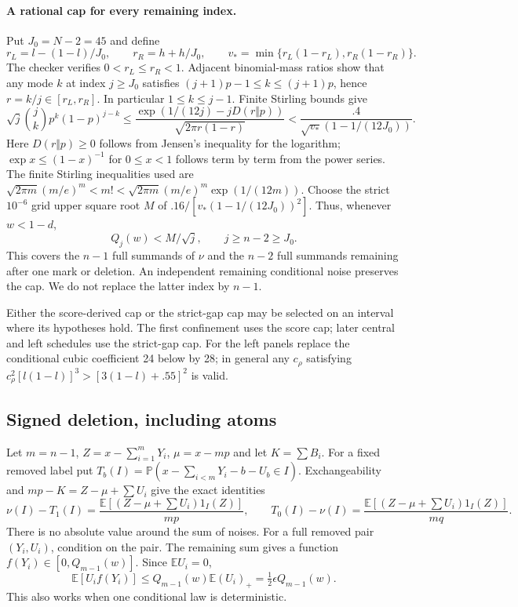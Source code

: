 \documentclass[11pt,a4paper]{article}
\numberwithin{equation}{section}
\theoremstyle{definition}
\theoremstyle{remark}
\newcommand{\E}{\mathbb E}
\newcommand{\Pp}{\mathbb P}
\begin{document}
\paragraph{A rational cap for every remaining index.}
Put $J_0=N-2=45$ and define
\[
 r_L=l-(1-l)/J_0,\qquad r_R=h+h/J_0,\qquad
 v_* =\min\{r_L(1-r_L),r_R(1-r_R)\}.
\]
The checker verifies $0<r_L\le r_R<1$. Adjacent binomial-mass ratios
show that any mode $k$ at index $j\ge J_0$ satisfies
$(j+1)p-1\le k\le(j+1)p$, hence $r=k/j\in[r_L,r_R]$.
In particular $1\le k\le j-1$. Finite Stirling bounds give
\[
 \sqrt j\binom jk p^k(1-p)^{j-k}
 \le\frac{\exp(1/(12j)-jD(r\Vert p))}{\sqrt{2\pi r(1-r)}}
 <\frac{.4}{\sqrt{v_*}(1-1/(12J_0))}.
\]
Here $D(r\Vert p)\ge0$ follows from Jensen's inequality for the logarithm;
$\exp x\le(1-x)^{-1}$ for $0\le x<1$ follows term by term from the
power series. The finite Stirling inequalities used are
$\sqrt{2\pi m}(m/e)^m<m!<\sqrt{2\pi m}(m/e)^m\exp(1/(12m))$.
Choose the strict $10^{-6}$ grid upper square root $M$ of
$.16/[v_*(1-1/(12J_0))^2]$. Thus, whenever $w<1-d$,
\begin{equation}\label{cut49:conf:antichainconcentration}
 Q_j(w)<M/\sqrt j,\qquad j\ge n-2\ge J_0.
\end{equation}
This covers the $n-1$ full summands of $\nu$ and the $n-2$ full summands
remaining after one mark or deletion. An independent remaining conditional
noise preserves the cap. We do not replace the latter index by $n-1$.

Either the score-derived cap or the strict-gap cap may be selected on
an interval where its hypotheses hold. The first confinement uses the
score cap; later central and left schedules use the strict-gap cap.
For the left panels replace the conditional cubic coefficient 24 below
by 28; in general any $c_\rho$ satisfying
$c_\rho^2[l(1-l)]^3>[3(1-l)+.55]^2$ is valid.
\subsection{Signed deletion, including atoms}
Let $m=n-1$, $Z=x-\sum_{i=1}^mY_i$, $\mu=x-mp$ and let $K=\sum B_i$.
For a fixed removed label put
$T_b(I)=\Pp(x-\sum_{i<m}Y_i-b-U_b\in I)$.
Exchangeability and $mp-K=Z-\mu+\sum U_i$ give the exact identities
\[
 \nu(I)-T_1(I)=\frac{\E[(Z-\mu+\sum U_i)1_I(Z)]}{mp},\qquad
 T_0(I)-\nu(I)=\frac{\E[(Z-\mu+\sum U_i)1_I(Z)]}{mq}.
\]
There is no absolute value around the sum of noises.
For a full removed pair $(Y_i,U_i)$, condition on the pair. The remaining
sum gives a function $f(Y_i)\in[0,Q_{m-1}(w)]$. Since $\E U_i=0$,
\[
 \E[U_i f(Y_i)]\le Q_{m-1}(w)\E(U_i)_+
 =\tfrac12\epsilon Q_{m-1}(w).
\]
This also works when one conditional law is deterministic.
\end{document}
